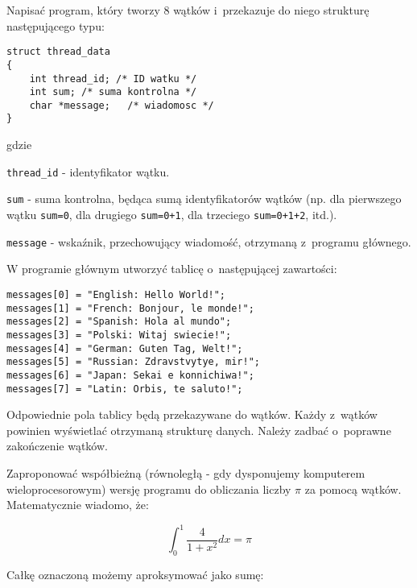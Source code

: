 \begin{myenumerate}
\item Napisać program, który tworzy $8$ wątków i~przekazuje do niego strukturę następującego typu:

\begin{lstlisting}[style=MyCStyle]
struct thread_data
{
	int	thread_id; /* ID watku */
	int sum; /* suma kontrolna */
	char *message;	 /* wiadomosc */
}
\end{lstlisting}

gdzie

\begin{myitemize}
\item \lstinline[style=MyCStyle]{thread_id} - identyfikator wątku.
\item \lstinline[style=MyCStyle]{sum} - suma kontrolna, będąca sumą identyfikatorów wątków (np. dla pierwszego wątku \mbox{\lstinline[style=MyCStyle]{sum=0}}, dla drugiego \lstinline[style=MyCStyle]{sum=0+1}, dla trzeciego \lstinline[style=MyCStyle]{sum=0+1+2}, itd.).
\item \lstinline[style=MyCStyle]{message} - wskaźnik, przechowujący wiadomość, otrzymaną z~programu głównego.
\end{myitemize}

W programie głównym utworzyć tablicę o~następującej zawartości:

\begin{lstlisting}[style=MyCStyle]
messages[0] = "English: Hello World!";
messages[1] = "French: Bonjour, le monde!";
messages[2] = "Spanish: Hola al mundo";
messages[3] = "Polski: Witaj swiecie!";
messages[4] = "German: Guten Tag, Welt!";
messages[5] = "Russian: Zdravstvytye, mir!";
messages[6] = "Japan: Sekai e konnichiwa!";
messages[7] = "Latin: Orbis, te saluto!";
\end{lstlisting}

Odpowiednie pola tablicy będą przekazywane do wątków. Każdy z~wątków powinien wyświetlać otrzymaną strukturę danych. Należy zadbać o~poprawne zakończenie wątków.

\item Zaproponować współbieżną (równoległą - gdy dysponujemy komputerem wieloprocesorowym) wersję programu do obliczania liczby $\pi$ za pomocą wątków. Matematycznie wiadomo, że:

\begin{equation}\nonumber
\displaystyle\int_0^1{\frac{4}{1+x^2}dx}=\pi
\end{equation}

Całkę oznaczoną możemy aproksymować jako sumę:


\end{myenumerate}
